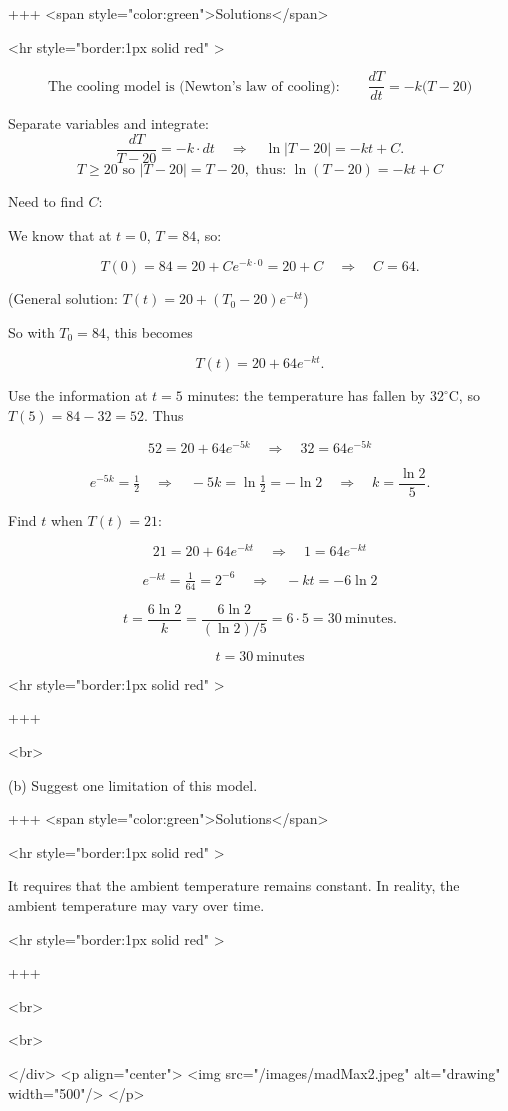 +++ <span style="color:green">Solutions</span>

<hr style="border:1px solid red" >

$$
\text{The cooling model is (Newton's law of cooling):}\qquad \frac{dT}{dt} = -k\bigl(T-20\bigr)
$$

Separate variables and integrate:
$$
\frac{dT}{T-20} = -k \cdot dt \quad\Longrightarrow\quad \ln|T-20| = -kt + C.
$$
$$
T \geq 20 \text{ so } |T-20|=T-20, \text{ thus: } \ln(T-20) = -kt + C
$$

Need to find $C$:

We know that at $t=0$, $T=84$, so:

$$
T(0)=84=20 + C e^{-k\cdot 0} = 20 + C \quad\Longrightarrow\quad C=64.
$$

(General solution: $T(t)=20 + (T_0-20)e^{-kt}$)

So with $T_0=84$, this becomes

$$
T(t)=20 + 64e^{-kt}.
$$

Use the information at $t=5$ minutes: the temperature has fallen by $32^\circ\mathrm{C}$, so $T(5)=84-32=52$. Thus

$$
52 = 20 + 64e^{-5k} \quad\Longrightarrow\quad 32 = 64e^{-5k}
$$


$$
e^{-5k}=\tfrac{1}{2}\quad\Longrightarrow\quad -5k=\ln\!\tfrac{1}{2}=-\ln 2
\quad\Longrightarrow\quad k=\frac{\ln 2}{5}.
$$


Find $t$ when $T(t)=21$:

$$
21 = 20 + 64e^{-kt}\quad\Longrightarrow\quad 1 = 64e^{-kt}
$$


$$
e^{-kt}=\tfrac{1}{64} = 2^{-6}\quad\Longrightarrow\quad -kt=-6\ln 2
$$


$$
t=\frac{6\ln 2}{k} = \frac{6\ln 2}{(\ln 2)/5}=6\cdot 5 = 30\ \text{minutes}.
$$

$$
t=30\ \text{minutes}
$$

<hr style="border:1px solid red" >

+++

<br>

(b) Suggest one limitation of this model.


+++ <span style="color:green">Solutions</span>

<hr style="border:1px solid red" >

It requires that the ambient temperature remains constant. In reality, the ambient temperature may vary over time.

<hr style="border:1px solid red" >

+++

<br>

<br>

</div>
<p align="center">
<img src="/images/madMax2.jpeg" alt="drawing" width="500"/>
</p>

